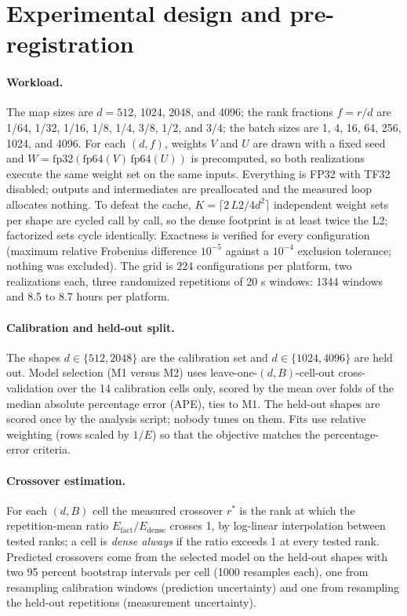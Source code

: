 \documentclass{article}
\newcommand{\rstar}{r^{*}}
\newcommand{\Efact}{E_{\mathrm{fact}}}
\newcommand{\Edense}{E_{\mathrm{dense}}}
\begin{document}
\section{Experimental design and pre-registration}
\label{sec:design}

\paragraph{Workload.} The map sizes are $d = 512$, 1024, 2048, and 4096; the rank fractions $f = r/d$ are 1/64, 1/32, 1/16, 1/8, 1/4, 3/8, 1/2, and 3/4; the batch sizes are 1, 4, 16, 64, 256, 1024, and 4096. For each $(d, f)$, weights $V$ and $U$ are drawn with a fixed seed and $W = \mathrm{fp32}(\mathrm{fp64}(V)\,\mathrm{fp64}(U))$ is precomputed, so both realizations execute the same weight set on the same inputs. Everything is FP32 with TF32 disabled; outputs and intermediates are preallocated and the measured loop allocates nothing. To defeat the cache, $K = \lceil 2\,L2 / 4d^2 \rceil$ independent weight sets per shape are cycled call by call, so the dense footprint is at least twice the L2; factorized sets cycle identically. Exactness is verified for every configuration (maximum relative Frobenius difference $10^{-5}$ against a $10^{-4}$ exclusion tolerance; nothing was excluded). The grid is 224 configurations per platform, two realizations each, three randomized repetitions of 20 s windows: 1344 windows and 8.5 to 8.7 hours per platform.

\paragraph{Calibration and held-out split.} The shapes $d \in \{512, 2048\}$ are the calibration set and $d \in \{1024, 4096\}$ are held out. Model selection (M1 versus M2) uses leave-one-$(d, B)$-cell-out cross-validation over the 14 calibration cells only, scored by the mean over folds of the median absolute percentage error (APE), ties to M1. The held-out shapes are scored once by the analysis script; nobody tunes on them. Fits use relative weighting (rows scaled by $1/E$) so that the objective matches the percentage-error criteria.

\paragraph{Crossover estimation.} For each $(d, B)$ cell the measured crossover $\rstar$ is the rank at which the repetition-mean ratio $\Efact / \Edense$ crosses 1, by log-linear interpolation between tested ranks; a cell is \emph{dense always} if the ratio exceeds 1 at every tested rank. Predicted crossovers come from the selected model on the held-out shapes with two 95 percent bootstrap intervals per cell (1000 resamples each), one from resampling calibration windows (prediction uncertainty) and one from resampling the held-out repetitions (measurement uncertainty).
\end{document}

